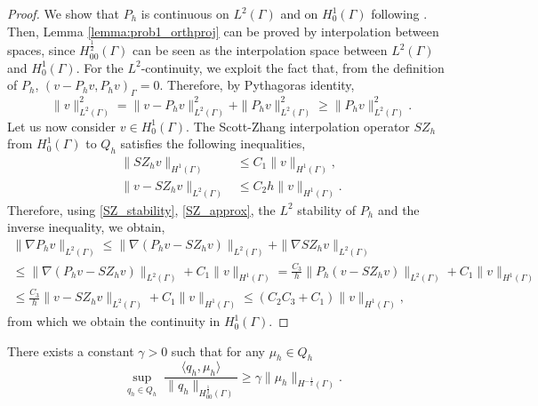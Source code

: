 \documentclass[r]{siamart171218}
\begin{document}
\begin{proof}
We show that $P_h$ is continuous on $L^2(\Gamma)$ and on $H^1_0(\Gamma)$ following \cite[Section 1.6.3]{MR2050138}.  Then, Lemma \ref{lemma:prob1_orthproj} can be proved by interpolation between spaces, since $H^\frac12_{00}(\Gamma)$ can be seen as the interpolation space between $L^2(\Gamma)$ and $H^1_0(\Gamma)$. For the $L^2$-continuity, we exploit the fact that, from the definition of $P_h$, $(v-P_h v,P_h v)_{\Gamma}=0$.
Therefore, by Pythagoras identity,
\begin{equation*}
\|v\|^2_{L^2(\Gamma)} = \|v-P_h v\|_{L^2(\Gamma)}^2 + \|P_h v\|_{L^2(\Gamma)}^2 \geq \|P_h v\|^2 _{L^2(\Gamma)}.
\end{equation*}
Let us now consider $v\in H^1_0(\Gamma)$. The Scott-Zhang interpolation operator $SZ_h$ from $H^1_0(\Gamma)$ to $Q_h$ satisfies the following inequalities,
\begin{align}
\label{SZ_stability}
\|SZ_h v\|_{H^1(\Gamma)} &\leq C_1 \|v\|_{H^1(\Gamma)},
\\
\label{SZ_approx}
\|v -SZ_h v \|_{L^2(\Gamma)} &\leq C_2 h \|v\|_{H^1(\Gamma)}.
\end{align}
Therefore, using \eqref{SZ_stability}, \eqref{SZ_approx}, 
the $L^2$ stability of $P_h$ and the inverse inequality, we obtain,
\begin{multline*}
\|\nabla P_h v\|_{L^2(\Gamma)} 
\leq \|\nabla (P_h v - SZ_h v)\|_{L^2(\Gamma)} + \|\nabla SZ_h v\|_{L^2(\Gamma)}
\\
\leq  \|\nabla (P_h v - SZ_h v)\|_{L^2(\Gamma)} + C_1\|v\|_{H^1(\Gamma)}
= \frac{C_3}{h} \|P_h (v - SZ_h v)\|_{L^2(\Gamma)} + C_1\|v\|_{H^1(\Gamma)}
\\
\leq \frac{C_3}{h} \|v - SZ_h v\|_{L^2(\Gamma)} + C_1\|v\|_{H^1(\Gamma)}
\leq (C_2 C_3 +C_1) \|v\|_{H^1(\Gamma)},
\end{multline*}
from which we obtain the continuity in $H^1_0(\Gamma)$.
\end{proof}

\begin{lemma}\label{lemma:trspace_infsup} 
There exists a constant $\gamma >0$ such that for any $\mu_h\in Q_h$
\begin{equation*}
\sup_{\substack{q_h \in Q_h}} \frac{\langle q_h , \mu_h \rangle}{ \|q_h\|_{H^{\frac 12}_{00}(\Gamma)}} \geq \gamma \|\mu_h\|_{H^{-\frac 12}(\Gamma)}.
\end{equation*} 
\end{lemma}
\end{document}
